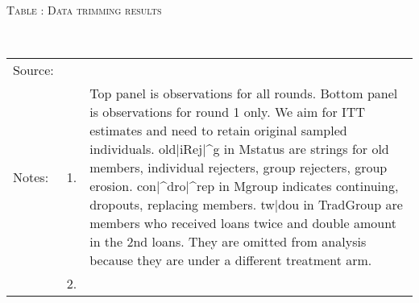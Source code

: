 \hspace{-1cm}\begin{minipage}[t]{14cm}
\hfil\textsc{\normalsize Table \thetable: Data trimming results\label{tab trim}}\\
\setlength{\tabcolsep}{1pt}
\setlength{\baselineskip}{8pt}
\renewcommand{\arraystretch}{.48}
\hfil{}\\
\renewcommand{\arraystretch}{.8}
\setlength{\tabcolsep}{1pt}
\begin{tabular}{>{\hfill\scriptsize}p{1cm}<{}>{\hfill\scriptsize}p{.25cm}<{}>{\scriptsize}p{12cm}<{\hfill}}
Source:& \multicolumn{2}{l}{\scriptsize GUK survey data.}\\
Notes: & 1. & Top panel is observations for all rounds. Bottom panel is observations for round 1 only. We aim for ITT estimates and need to retain original sampled individuals. old$|$iRej$|$\^{}g in \textsf{Mstatus} are strings for old members, individual rejecters, group rejecters, group erosion. con$|$\^{}dro$|$\^{}rep in \textsf{Mgroup} indicates continuing, dropouts, replacing members. tw$|$dou in \textsf{TradGroup} are members who received loans twice and double amount in the 2nd loans. They are omitted from analysis because they are under a different treatment arm.\\
& 2. & 
\end{tabular}
\end{minipage}

